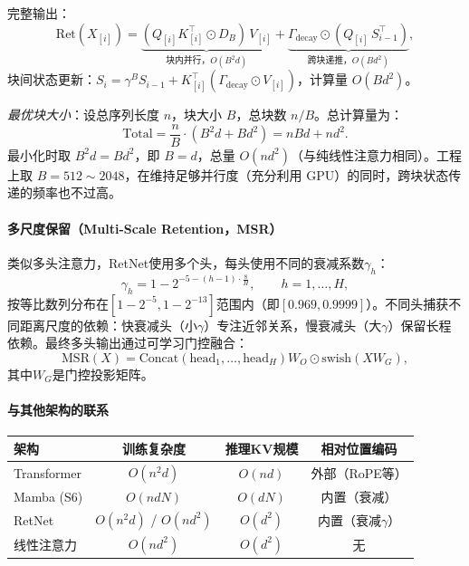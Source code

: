 \documentclass[12pt,a4paper]{article}
\begin{document}
完整输出：
\begin{equation}
\text{Ret}(X_{[i]}) = \underbrace{(Q_{[i]} K_{[i]}^\top \odot D_B)\, V_{[i]}}_{\text{块内并行，} O(B^2 d)} + \underbrace{\Gamma_{\text{decay}} \odot (Q_{[i]}\, S_{i-1}^\top)}_{\text{跨块递推，}O(Bd^2)},
\end{equation}
块间状态更新：$S_i = \gamma^B S_{i-1} + K_{[i]}^\top (\Gamma_{\text{decay}} \odot V_{[i]})$，计算量 $O(Bd^2)$。

\textit{最优块大小}：设总序列长度 $n$，块大小 $B$，总块数 $n/B$。总计算量为：
\begin{equation}
\text{Total} = \frac{n}{B} \cdot (B^2 d + Bd^2) = nBd + nd^2.
\end{equation}
最小化时取 $B^2 d = Bd^2$，即 $B = d$，总量 $O(nd^2)$（与纯线性注意力相同）。工程上取 $B = 512 \sim 2048$，在维持足够并行度（充分利用 GPU）的同时，跨块状态传递的频率也不过高。

\paragraph{多尺度保留（Multi-Scale Retention，MSR）}

类似多头注意力，RetNet使用多个头，每头使用不同的衰减系数$\gamma_h$：
\begin{equation}
\gamma_h = 1 - 2^{-5 - (h-1) \cdot \frac{8}{H}}, \qquad h = 1, \ldots, H,
\end{equation}
按等比数列分布在$[1-2^{-5}, 1-2^{-13}]$范围内（即$[0.969, 0.9999]$）。不同头捕获不同距离尺度的依赖：快衰减头（小$\gamma$）专注近邻关系，慢衰减头（大$\gamma$）保留长程依赖。最终多头输出通过可学习门控融合：
\begin{equation}
\text{MSR}(X) = \text{Concat}(\text{head}_1, \ldots, \text{head}_H) W_O \odot \text{swish}(X W_G),
\end{equation}
其中$W_G$是门控投影矩阵。

\paragraph{与其他架构的联系}

\begin{center}
\begin{tabular}{lccc}
\hline
\textbf{架构} & \textbf{训练复杂度} & \textbf{推理KV规模} & \textbf{相对位置编码} \\
\hline
Transformer & $O(n^2 d)$ & $O(n d)$ & 外部（RoPE等） \\
Mamba (S6) & $O(n d N)$ & $O(d N)$ & 内置（衰减） \\
RetNet & $O(n^2 d)$ / $O(n d^2)$ & $O(d^2)$ & 内置（衰减$\gamma$） \\
线性注意力 & $O(n d^2)$ & $O(d^2)$ & 无 \\
\hline
\end{tabular}
\end{center}
\end{document}

